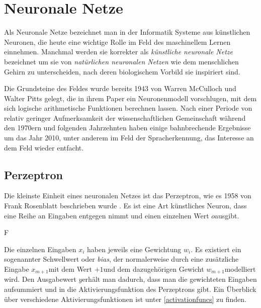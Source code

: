 \section{Neuronale Netze}

Als Neuronale Netze  %
bezeichnet man in der Informatik Systeme aus künstlichen Neuronen, die heute eine wichtige Rolle im Feld des maschinellem Lernen einnehmen.
Manchmal werden sie korrekter als \textit{künstliche neuronale Netze} bezeichnet um sie von \textit{natürlichen neuronalen Netzen} 
wie dem menschlichen Gehirn zu unterscheiden, nach deren biologischem Vorbild sie inspiriert sind.

Die Grundsteine des Feldes wurde bereits 1943 von Warren McCulloch und Walter Pitts gelegt, 
die in ihrem Paper \cite{mcculloch1943logical} ein Neuronenmodell vorschlugen, mit dem sich logische arithmetische Funktionen berechnen lassen. 
Nach einer Periode von relativ geringer Aufmerksamkeit der wissenschaftlichen Gemeinschaft während den 1970ern und folgenden Jahrzehnten 
haben einige bahnbrechende Ergebnisse um das Jahr 2010, unter anderem im Feld der Spracherkennung, das Interesse an dem Feld wieder entfacht. 



\subsection{Perzeptron}
Die kleinste Einheit eines neuronalen Netzes ist das Perzeptron, wie es 1958 von Frank Rosenblatt beschrieben wurde \cite{rosenblatt1958perceptron}.
Es ist eine Art künstliches Neuron, dass eine Reihe an Eingaben entgegen nimmt und einen einzelnen Wert \(o\)ausgibt.

F

Die einzelnen Eingaben \(x_i\) haben jeweils eine Gewichtung \(w_i\).
Es existiert ein sogenannter Schwellwert oder \textit{bias}, der normalerweise 
durch eine zusätzliche Eingabe \(x_{m+1}\)mit dem Wert \(+1\)und dem dazugehörigen Gewicht \(w_{m+1}\)modelliert wird.
Den Ausgabewert \(y\)erhält man dadurch, dass man die gewichteten Eingaben aufsummiert und in die Aktivierungsfunktion des Perzeptrons gibt.
Ein Überblick über verschiedene Aktivierungsfunktionen ist unter \ref{activationfuncs} zu finden.

